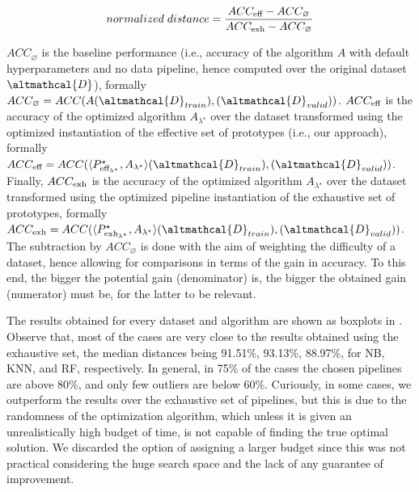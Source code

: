 \begin{equation*}
    normalized\;distance = \frac{ACC_{\textup{eff}} - ACC_{\varnothing}}{ACC_{\textup{exh}} - ACC_{\varnothing}}
\end{equation*}

$ACC_{\varnothing}$ is the baseline performance (i.e., accuracy of the algorithm $A$ with default hyperparameters and no data pipeline, hence computed over the original dataset $\altmathcal{D}$), formally $ACC_{\varnothing} = ACC(A(\altmathcal{D}_{train}), (\altmathcal{D}_{valid}))$.
$ACC_{\textup{eff}}$ is the accuracy of the optimized algorithm $A_{{\lambda}^{\star}}$ over the dataset transformed using the optimized instantiation of the effective set of prototypes (i.e., our approach), formally $ACC_{\textup{eff}} = ACC(\langle P^{\star}_{\textup{eff}_{{\lambda}^{\star}}}, A_{\lambda^\star} \rangle (\altmathcal{D}_{train}), (\altmathcal{D}_{valid}))$.
Finally, $ACC_{\textup{exh}}$ is the accuracy of the optimized algorithm $A_{{\lambda}^{\star}}$ over the dataset transformed using the optimized pipeline instantiation of the exhaustive set of prototypes, formally $ACC_{\textup{exh}} = ACC(\langle P^{\star}_{\textup{exh}_{{\lambda}^{\star}}}, A_{\lambda^\star} \rangle (\altmathcal{D}_{train}), (\altmathcal{D}_{valid}))$.
The subtraction by $ACC_{\varnothing}$ is done with the aim of weighting the difficulty of a dataset, hence allowing for comparisons in terms of the gain in accuracy.
To this end, the bigger the potential gain (denominator) is, the bigger the obtained gain (numerator) must be, for the latter to be relevant.

The results obtained for every dataset and algorithm are shown as boxplots in .
Observe that, most of the cases are very close to the results obtained using the exhaustive set, the median distances being 91.51\%, 93.13\%, 88.97\%, for NB, KNN, and RF, respectively.
In general, in 75\% of the cases the chosen pipelines are above 80\%, and only few outliers are below 60\%.
Curiously, in some cases, we outperform the results over the exhaustive set of pipelines, but this is due to the randomness of the optimization algorithm, which unless it is given an unrealistically high budget of time, is not capable of finding the true optimal solution.
We discarded the option of assigning a larger budget since this was not practical considering the huge search space and the lack of any guarantee of improvement.

